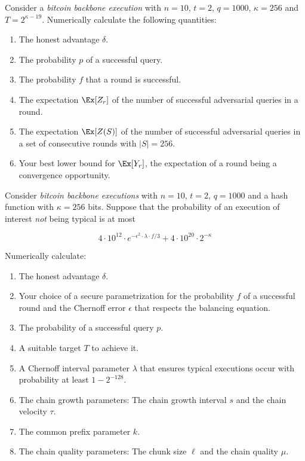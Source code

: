 \begin{problems}
    \item Consider a \emph{bitcoin backbone execution} with $n = 10$, $t = 2$,
          $q = 1000$, $\kappa = 256$ and $T = 2^{\kappa - 19}$. Numerically
          calculate the following quantities:

          \begin{enumerate}
            \item The honest advantage $\delta$.
            \item The probability $p$ of a successful query.
            \item The probability $f$ that a round is successful.
            \item The expectation $\Ex[Z_r]$ of the number of successful
                  adversarial queries in a round.
            \item The expectation $\Ex[Z(S)]$ of the number of successful
                  adversarial queries in a set of consecutive rounds with
                  $|S| = 256$.
            \item Your best lower bound for $\Ex[Y_r]$, the expectation of a
                  round being a convergence opportunity.
          \end{enumerate}

    \item Consider \emph{bitcoin backbone executions} with $n = 10$, $t = 2$,
          $q = 1000$ and a hash function with $\kappa = 256$ bits. Suppose that
          the probability of an execution of interest \emph{not} being typical is at most

          \[
            4 \cdot 10^{12} \cdot e^{- \epsilon ^ 2 \cdot \lambda \cdot f / 3}
            + 4 \cdot 10^{20} \cdot 2^{-\kappa}
          \]

          Numerically calculate:

          \begin{enumerate}
            \item The honest advantage $\delta$.
            \item Your choice of a secure parametrization for the probability
                  $f$ of a successful round and the Chernoff error $\epsilon$
                  that respects the balancing equation.
            \item The probability of a successful query $p$.
            \item A suitable target $T$ to achieve it.
            \item A Chernoff interval parameter $\lambda$ that ensures typical
                  executions occur with probability at least $1 - 2^{-128}$.
            \item The chain growth parameters: The chain growth interval $s$ and
                  the chain velocity $\tau$.
            \item The common prefix parameter $k$.
            \item The chain quality parameters: The chunk size $\ell$ and the
                  chain quality $\mu$.
          \end{enumerate}
    

\end{problems}
